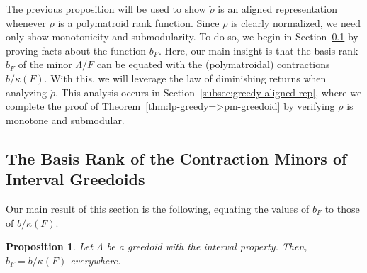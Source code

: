 \documentclass[11pt]{article}
\newtheorem{proposition}[theorem]{Proposition}
\newcommand{\glang}{\Lambda}
\newcommand{\greedyrep}{\ddot{\rho}}
\begin{document}
The previous proposition will be used to show $\greedyrep$ is an aligned representation whenever $\greedyrep$ is a polymatroid rank function.
Since $\greedyrep$ is clearly normalized, we need only show monotonicity and submodularity.
To do so, we begin in Section~\ref{subsec:bf-rank} by proving facts about the function $b_F$.
Here, our main insight is that the basis rank $b_F$ of the minor $\glang/F$ can be equated with the (polymatroidal) contractions $b/\kappa(F)$.
With this, we will leverage the law of diminishing returns when analyzing $\greedyrep$.
This analysis occurs in Section~\ref{subsec:greedy-aligned-rep}, where we complete the proof of Theorem~\ref{thm:lp-greedy=>pm-greedoid} by verifying $\greedyrep$ is monotone and submodular.

\subsection{The Basis Rank of the Contraction Minors of Interval Greedoids}\label{subsec:bf-rank}
Our main result of this section is the following, equating the values of $b_F$ to those of $b/\kappa(F)$.
\begin{proposition}\label{prop:bf}
    Let $\glang$ be a greedoid with the interval property.
    Then, $b_F = b/\kappa(F)$ everywhere.
\end{proposition}
\end{document}
